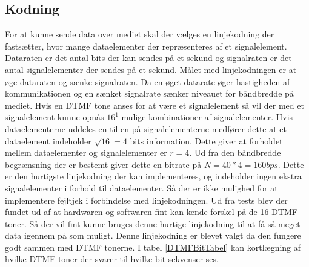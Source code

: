 \subsection{Kodning}
For at kunne sende data over mediet skal der vælges en linjekodning der fastsætter, hvor mange dataelementer der repræsenteres af et signalelement. Dataraten er det antal bits der kan sendes på et sekund og signalraten er det antal signalelementer der sendes på et sekund. Målet med linjekodningen er at øge dataraten og sænke signalraten. Da en øget datarate øger hastigheden af kommunikationen og en sænket signalrate sænker niveauet for båndbredde på mediet. Hvis en DTMF tone anses for at være et signalelement så vil der med et signalelement kunne opnås $16^{1}$ mulige kombinationer af signalelementer. Hvis dataelementerne uddeles en til en på signalelementerne medfører dette at et dataelement indeholder $\sqrt{16}=4$ bits information. Dette giver at forholdet mellem dataelementer og signalelementer er $r=4$. Ud fra den båndbredde begrænsning der er bestemt giver dette en bitrate på $N=40*4=160bps$. Dette er den hurtigste linjekodning der kan implementeres, og indeholder ingen ekstra signalelementer i forhold til dataelementer. Så der er ikke mulighed for at implementere fejltjek i forbindelse med linjekodningen. Ud fra tests blev der fundet ud af at hardwaren og softwaren fint kan kende forskel på de 16 DTMF toner. Så der vil fint kunne bruges denne hurtige linjekodning til at få så meget data igennem på som muligt. Denne linjekodning er blevet valgt da den fungere godt sammen med DTMF tonerne. I tabel \ref{DTMFBitTabel} kan kortlægning af hvilke DTMF toner der svarer til hvilke bit sekvenser ses.

